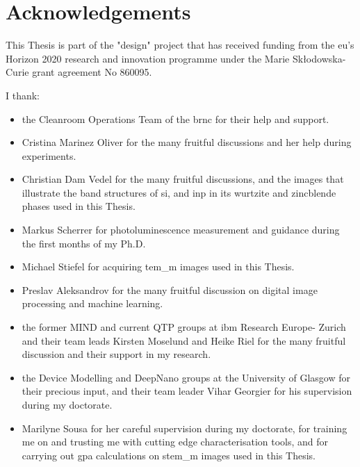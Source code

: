 \chapter{Acknowledgements}

This Thesis is part of the "\acl{design}" project that has received funding from the \acl{eu}’s Horizon 2020 research and innovation programme under the Marie Skłodowska-Curie grant agreement No 860095. 

I thank:
\begin{itemize}
    \item the Cleanroom Operations Team of the \acl{brnc} for their help and support. 
    \item Cristina Marinez Oliver for the many fruitful discussions and her help during experiments.
    \item Christian Dam Vedel for the many fruitful discussions, and the images that illustrate the band structures of \acs{si}, and \acs{inp} in its wurtzite and zincblende phases used in this Thesis.
    \item Markus Scherrer for photoluminescence measurement and guidance during the first months of my Ph.D. 
    \item Michael Stiefel for acquiring \acs{tem_m} images used in this Thesis. 
    \item Preslav Aleksandrov for the many fruitful discussion on digital image processing and machine learning.
    \item the former MIND and current QTP groups at \acs{ibm} Research Europe- Zurich and their team leads Kirsten Moselund and Heike Riel for the many fruitful discussion and their support in my research.
    \item the Device Modelling and DeepNano groups at the University of Glasgow for their precious input, and their team leader Vihar Georgier for his supervision during my doctorate.
    \item Marilyne Sousa for her careful supervision during my doctorate, for training me on and trusting me with cutting edge characterisation tools, and for carrying out \acs{gpa} calculations on \acs{stem_m} images used in this Thesis. 
\end{itemize}



